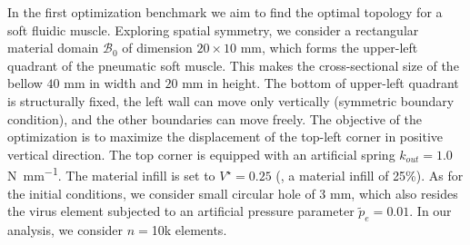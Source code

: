 In the first optimization benchmark we aim to find the optimal topology for a soft fluidic muscle. Exploring spatial symmetry, we consider a rectangular material domain $\mathcal{B}_0$ of dimension $20 \times 10$ \si{\milli \meter}, which forms the upper-left quadrant of the pneumatic soft muscle. This makes the cross-sectional size of the bellow $40$ \si{\milli \meter} in width and $20$ \si{\milli \meter} in height. The bottom of upper-left quadrant is structurally fixed, the left wall can move only vertically (symmetric boundary condition), and the other boundaries can move freely. The objective of the optimization is to maximize the displacement of the top-left corner in positive vertical direction. The top corner is equipped with an artificial spring $k_{out} = 1.0$ \si{\newton \per \milli \meter}. The material infill is set to $V^\star = 0.25$ (\ie, a material infill of 25\%). As for the initial conditions, we consider small circular hole of $3$ \si{\milli \meter}, which also resides the virus element subjected to an artificial pressure parameter $\tilde{p}_e = 0.01$. In our analysis, we consider $n=$10k elements.
%
